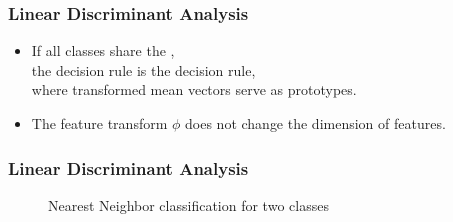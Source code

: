 \begin{frame}
  \frametitle{Linear Discriminant Analysis \cont}

  
  \begin{itemize}
    \item If all classes share the , \\ the decision rule is the
       decision rule, \\ 
      where transformed mean vectors serve as prototypes. \\[.5cm]
    \item The feature transform $\phi$ does not change the dimension of features.
  \end{itemize}
\end{frame}


\begin{frame}
  \frametitle{Linear Discriminant Analysis \cont}

  \begin{figure}
    \resizebox{0.35\linewidth}{!}{
      
    }
    \caption{Nearest Neighbor classification for two classes}
  \end{figure}
\end{frame}


